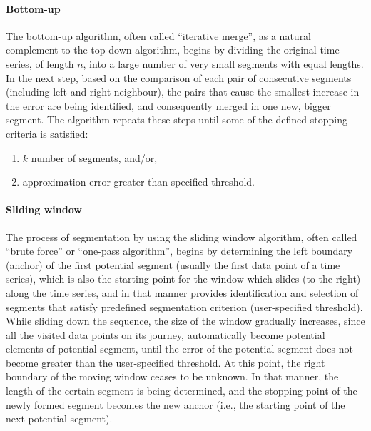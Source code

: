 \documentclass[a4paper]{article}
\begin{document}
\paragraph{Bottom-up} The bottom-up algorithm, often called \enquote{iterative merge}, as a natural complement to the top-down algorithm, begins by dividing the original time series, of length $n$, into a large number of very small segments with equal lengths. In the next step, based on the comparison of each pair of consecutive segments (including left and right neighbour), the pairs that cause the smallest increase in the error are being identified, and consequently merged in one new, bigger segment. The algorithm repeats these steps until some of the defined stopping criteria is satisfied: 
\begin{enumerate}
	\item $k$ number of segments, and/or,
	\item approximation error greater than specified threshold.
\end{enumerate}

\paragraph{Sliding window} The process of segmentation by using the sliding window algorithm, often called \enquote{brute force} or \enquote{one-pass algorithm}, begins by determining the left boundary (anchor) of the first potential segment (usually the first data point of a time series), which is also the starting point for the window which slides (to the right) along the time series, and in that manner provides identification and selection of segments that satisfy predefined segmentation criterion (user-specified threshold). While sliding down the sequence, the size of the window gradually increases, since all the visited data points on its journey, automatically become potential elements of potential segment, until the error of the potential segment does not become greater than the user-specified threshold. At this point, the right boundary of the moving window ceases to be unknown. In that manner, the length of the certain segment is being determined, and the stopping point of the newly formed segment becomes the new anchor (i.e., the starting point of the next potential segment).
\end{document}
